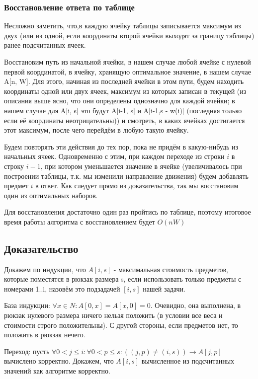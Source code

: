 \documentclass{article}
\begin{document}
	\subsubsection{Восстановление ответа по таблице}
	
	Несложно заметить, что,в каждую ячейку таблицы записывается максимум из двух (или из одной, если координаты второй ячейки выходят за границу таблицы) ранее подсчитанных ячеек.
	
	Восстановим путь из начальной ячейки, в нашем случае любой ячейке с нулевой первой координатой, в ячейку, хранящую оптимальное значение, в нашем случае A[n, W]. Для этого, начиная из последней ячейки в этом пути, будем находить координаты одной или двух ячеек, максимум из которых записан в текущей (из описания выше ясно, что они определены однозначно для каждой ячейки; в нашем случае для A[i, s] это будут A[i-1, s] и A[i-1,s - w(i)] (последняя только если её координаты неотрицательны)) и смотреть, в каких ячейках достигается этот максимум, после чего перейдём в любую такую ячейку. 
	
	Будем повторять эти действия до тех пор, пока не придём в какую-нибудь из начальных ячеек. Одновременно с этим, при каждом переходе из строки $i$ в строку $i-1$, при котором уменьшается значение в ячейке (увеличивалось при построении таблицы, т.к. мы изменили направление движения) будем добавлять предмет $i$ в ответ. Как следует прямо из доказательства, так мы восстановим один из оптимальных наборов.  
	
	Для восстановления достаточно один раз пройтись по таблице, поэтому итоговое время работы алгоритма с восстановлением будет $O(nW)$
	
	\subsection{Доказательство}
	
	Докажем по индукции, что $A[i, s]$ - максимальная стоимость предметов, которые поместятся в рюкзак размера s, если использовать только предметы с номерами 1..i, назовём это подзадачей $[i, s]$ нашей задачи.
	
	База индукции: $\forall x \in N: A[0, x] = A[x, 0] = 0$. Очевидно, она выполнена, в рюкзак нулевого размера ничего нельзя положить (в условии все веса и стоимости строго положительны). С другой стороны, если предметов нет, то положить в рюкзак нечего.
	
	Переход: пусть $\forall 0 < j \leq i: \forall 0 < p \leq s : ((j, p) \neq (i, s)) \rightarrow A[j, p]$ вычислено корректно. Докажем, что $A[i, s]$ вычисленное из подсчитанных значений как алгоритме корректно. 
	
\end{document}
